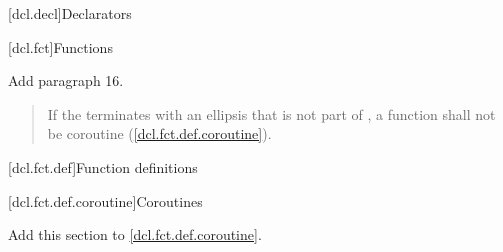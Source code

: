 
[dcl.decl]{Declarators}

\setcounter{section}{3}
\setcounter{subsection}{4}
[dcl.fct]{Functions}%

Add paragraph 16.

\begin{quote}
\setcounter{Paras}{15}
\pnum
If the  terminates with an ellipsis that is not part of , a function shall not be coroutine (\ref{dcl.fct.def.coroutine}).
\end{quote}

\setcounter{section}{3}
[dcl.fct.def]{Function definitions}

\setcounter{subsection}{3}
[dcl.fct.def.coroutine]{Coroutines}

Add this section to \ref{dcl.fct.def.coroutine}.

